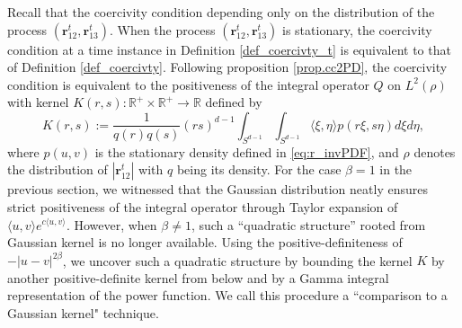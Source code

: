 \documentclass[]{elsarticle}
\def\R{\mathbb{R}}
\newcommand{\mbf}[1]{\boldsymbol{#1}}
\newcommand{\innerp}[2]{\langle #1,#2 \rangle}
\newcommand{\inp}[1]{\langle{#1}\rangle}
\newcommand{\br}{\mbf{r}}
\numberwithin{equation}{section}
\numberwithin{theorem}{section}
\begin{document}

\bigskip
Recall that the coercivity condition depending only on the distribution of the process $(\br_{12}^t,\br_{13}^t)$. When the process $(\br_{12}^t,\br_{13}^t)$ is stationary, the coercivity condition at a time instance in Definition \ref{def_coercivty_t} is equivalent to that of Definition \ref{def_coercivty}. Following proposition \ref{prop.cc2PD}, the coercivity condition is equivalent to the positiveness of the integral operator $Q$ on $L^2(\rho)$ with kernel $K(r,s):\R^+\times \R^+\to\R$ defined by 
  \begin{equation} \label{kernelK_inv}
K(r,s) := \frac{1}{q (r)q(s)} (rs)^{d-1}\int_{S^{d-1}}\int_{S^{d-1}}\innerp{\xi}{\eta} p(r\xi,s\eta) d\xi d\eta,
 \end{equation}
 where  $p(u,v)$ is the stationary density defined in \eqref{eq:r_invPDF}, and  $\rho$ denotes the distribution of $|\br_{12}^t|$ with $q$ being its density. For the case $\beta=1$ in the previous section, we witnessed that the Gaussian distribution neatly ensures strict positiveness of the integral operator through Taylor expansion of $\inp{u,v}e^{c\inp{u,v}}$. However, when $\beta\neq 1$, such a ``quadratic structure'' rooted from Gaussian kernel is no longer available. Using the positive-definiteness of $-|u-v|^{2\beta}$, we uncover such a quadratic structure by bounding the kernel $K$ by another positive-definite kernel from below and by a Gamma integral representation of the power function. We call this procedure a ``comparison to a Gaussian kernel" technique. 
 
\end{document}

